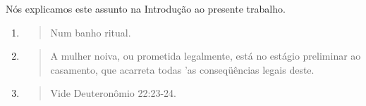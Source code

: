 Nós explicamos este assunto na Introdução ao presente trabalho.

\begin{enumerate}
\def\labelenumi{\arabic{enumi}.}
\setcounter{enumi}{442}
\item
  \begin{quote}
  Num banho ritual.
  \end{quote}
\item
  \begin{quote}
  A mulher noiva, ou prometida legalmente, está no estágio preliminar ao
  casamento, que acar­reta todas 'as conseqüências legais deste.
  \end{quote}
\item
  \begin{quote}
  Vide Deuteronômio 22:23-24.
  \end{quote}
\end{enumerate}

